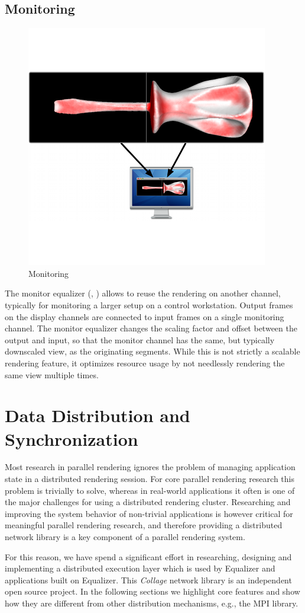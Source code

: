 \section{Monitoring}
\begin{figure}
  \includegraphics[width=.382\textwidth]{images/monitoreq}
  \caption{\label{fmonitor}Monitoring}
\end{figure}
The monitor equalizer (, ) allows to reuse the
rendering on another channel, typically for monitoring a larger setup on a
control workstation. Output frames on the display channels are connected to
input frames on a single monitoring channel. The monitor equalizer changes the
scaling factor and offset between the output and input, so that the monitor
channel has the same, but typically downscaled view, as the originating
segments. While this is not strictly a scalable rendering feature, it optimizes
resource usage by not needlessly rendering the same view multiple times.


\chapter{Data Distribution and Synchronization}\label{sCollage}

Most research in parallel rendering ignores the problem of managing application
state in a distributed rendering session. For core parallel rendering research
this problem is trivially to solve, whereas in real-world applications it often
is one of the major challenges for using a distributed rendering cluster.
Researching and improving the system behavior of non-trivial applications is
however critical for meaningful parallel rendering research, and therefore
providing a distributed network library is a key component of a parallel
rendering system.

For this reason, we have spend a significant effort in researching, designing
and implementing a distributed execution layer which is used by Equalizer and
applications built on Equalizer. This {\em Collage} network library is an
independent open source project. In the following sections we highlight core
features and show how they are different from other distribution mechanisms,
e.g., the MPI library.


